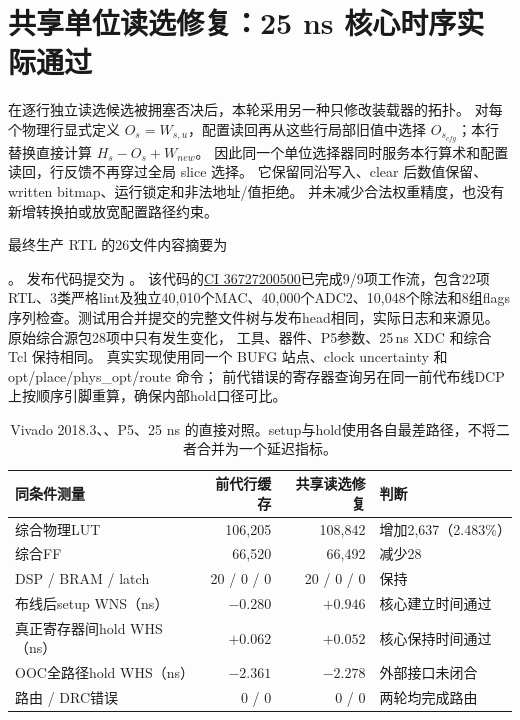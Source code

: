 \section{共享单位读选修复：25 ns 核心时序实际通过}
\label{sec:shared-selector-closure}
在逐行独立读选候选被拥塞否决后，本轮采用另一种只修改装载器的拓扑。
对每个物理行显式定义 \(O_s=W_{s,u}\)，配置读回再从这些行局部旧值中选择
\(O_{s_{cfg}}\)；本行替换直接计算 \(H_s-O_s+W_{new}\)。
因此同一个单位选择器同时服务本行算术和配置读回，行反馈不再穿过全局 slice 选择。
它保留同沿写入、clear 后数值保留、written bitmap、运行锁定和非法地址/值拒绝。
并未减少合法权重精度，也没有新增转换拍或放宽配置路径约束。

最终生产 RTL 的26文件内容摘要为
\par\noindent{}\par\noindent{}。
发布代码提交为 \href{https://github.com/defineiocc02/20bit_SAR_ADC_Behaviour_Verification/commit/71e7d5a017246340b9fa1f71cbbe99e20b6503f6}{}。
该代码的\href{https://github.com/defineiocc02/20bit_SAR_ADC_Behaviour_Verification/actions/runs/36727200500}{CI 36727200500}已完成9/9项工作流，包含22项RTL、3类严格lint及独立40,010个MAC、40,000个ADC2、10,048个除法和8组flags序列检查。测试用合并提交的完整文件树与发布head相同，实际日志和来源见。
原始综合源包28项中只有发生变化，
工具、器件、P5参数、25\,ns XDC 和综合 Tcl 保持相同。
真实实现使用同一个 BUFG 站点、clock uncertainty 和 opt/place/phys\_opt/route 命令；
前代错误的寄存器查询另在同一前代布线DCP上按顺序引脚重算，确保内部hold口径可比。

\begin{table}[H]\centering\small
\begin{tabular}{lrrl}\toprule
同条件测量&前代行缓存&共享读选修复&判断\\\midrule
综合物理LUT&106,205&108,842&增加2,637（2.483\%）\\
综合FF&66,520&66,492&减少28\\
DSP / BRAM / latch&20 / 0 / 0&20 / 0 / 0&保持\\
布线后setup WNS（ns）&$-0.280$&$+0.946$&核心建立时间通过\\
真正寄存器间hold WHS（ns）&$+0.062$&$+0.052$&核心保持时间通过\\
OOC全路径hold WHS（ns）&$-2.361$&$-2.278$&外部接口未闭合\\
路由 / DRC错误&0 / 0&0 / 0&两轮均完成路由\\
\bottomrule\end{tabular}
\caption{Vivado 2018.3、、P5、25 ns 的直接对照。setup与hold使用各自最差路径，不将二者合并为一个延迟指标。}
\end{table}

